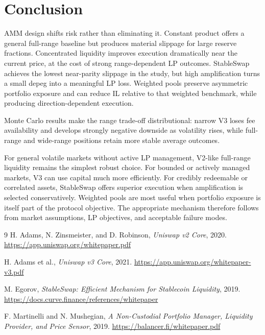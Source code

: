 \documentclass[11pt,twocolumn]{article}
\begin{document}
\section{Conclusion}

AMM design shifts risk rather than eliminating it. Constant product offers a
general full-range baseline but produces material slippage for large reserve
fractions. Concentrated liquidity improves execution dramatically near the
current price, at the cost of strong range-dependent LP outcomes. StableSwap
achieves the lowest near-parity slippage in the study, but high amplification
turns a small depeg into a meaningful LP loss. Weighted pools preserve
asymmetric portfolio exposure and can reduce IL relative to that weighted
benchmark, while producing direction-dependent execution.

Monte Carlo results make the range trade-off distributional: narrow V3 loses
fee availability and develops strongly negative downside as volatility rises,
while full-range and wide-range positions retain more stable average outcomes.

For general volatile markets without active LP management, V2-like full-range
liquidity remains the simplest robust choice. For bounded or actively managed
markets, V3 can use capital much more efficiently. For credibly redeemable or
correlated assets, StableSwap offers superior execution when amplification is
selected conservatively. Weighted pools are most useful when portfolio
exposure is itself part of the protocol objective. The appropriate mechanism
therefore follows from market assumptions, LP objectives, and acceptable
failure modes.

\begin{thebibliography}{9}
\setlength{\itemsep}{0pt}
\setlength{\parskip}{0pt}
H. Adams, N. Zinsmeister, and D. Robinson,
\emph{Uniswap v2 Core}, 2020.
\url{https://app.uniswap.org/whitepaper.pdf}

H. Adams et al.,
\emph{Uniswap v3 Core}, 2021.
\url{https://app.uniswap.org/whitepaper-v3.pdf}

M. Egorov,
\emph{StableSwap: Efficient Mechanism for Stablecoin Liquidity}, 2019.
\url{https://docs.curve.finance/references/whitepaper}

F. Martinelli and N. Mushegian,
\emph{A Non-Custodial Portfolio Manager, Liquidity Provider, and Price Sensor},
2019.
\url{https://balancer.fi/whitepaper.pdf}
\end{thebibliography}
\end{document}
